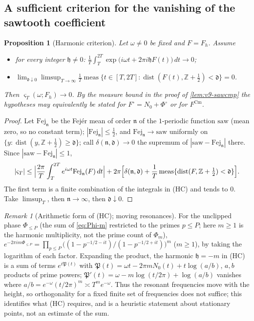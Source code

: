 \documentclass[11pt,a4paper]{article}
\numberwithin{equation}{section}
\newtheorem{proposition}[theorem]{Proposition}
\theoremstyle{definition}
\theoremstyle{remark}
\newtheorem{remark}[theorem]{Remark}
\newcommand{\meas}{\operatorname{meas}}
\newcommand{\Cm}{\mathrm{Cm}}
\begin{document}
\subsection{A sufficient criterion for the vanishing of the sawtooth coefficient}\label{sec:v9-harm}
\begin{proposition}[Harmonic criterion]\label{prop:v9-harm}
Let $\omega\ne0$ be fixed and $F=F_h$. Assume
\begin{itemize}[leftmargin=2em]
\item[(HC)] for every integer $\mathfrak h\ne0$: $\displaystyle\frac1T\int_T^{2T}\exp\bigl(i\omega t+2\pi i\mathfrak h F(t)\bigr)\,dt\to0$;
\item[(NC)] $\displaystyle\lim_{\mathfrak d\downarrow0}\limsup_{T\to\infty}\frac1T\meas\bigl\{t\in[T,2T]:\operatorname{dist}(F(t),\mathbb Z+\tfrac12)<\mathfrak d\bigr\}=0$.
\end{itemize}
Then $\varsigma_T(\omega;F_h)\to0$. By the measure bound in the proof of \cref{lem:v9-sawcmp} the hypotheses may equivalently be stated for $F^\circ=N_0+\Phi^\circ$ or for $F^{\Cm}$.
\end{proposition}
\begin{proof}
Let $\mathrm{Fej}_{\mathfrak n}$ be the Fej\'er mean of order $\mathfrak n$ of the $1$-periodic function $\mathrm{saw}$ (mean zero, so no constant term); $|\mathrm{Fej}_{\mathfrak n}|\le\frac12$, and $\mathrm{Fej}_{\mathfrak n}\to\mathrm{saw}$ uniformly on $\{y:\operatorname{dist}(y,\mathbb Z+\frac12)\ge\mathfrak d\}$; call $\delta(\mathfrak n,\mathfrak d)\to0$ the supremum of $|\mathrm{saw}-\mathrm{Fej}_{\mathfrak n}|$ there. Since $|\mathrm{saw}-\mathrm{Fej}_{\mathfrak n}|\le1$,
\begin{equation}
|\varsigma_T|\le\Bigl|\frac{2\pi}T\int_T^{2T}e^{i\omega t}\mathrm{Fej}_{\mathfrak n}(F)\,dt\Bigr|+2\pi\Bigl[\delta(\mathfrak n,\mathfrak d)+\frac1T\meas\{\operatorname{dist}(F,\mathbb Z+\tfrac12)<\mathfrak d\}\Bigr].
\end{equation}
The first term is a finite combination of the integrals in (HC) and tends to $0$. Take $\limsup_T$, then $\mathfrak n\to\infty$, then $\mathfrak d\downarrow0$.
\end{proof}
\begin{remark}[Arithmetic form of (HC); moving resonances]\label{rem:v9-res}
For the unclipped phase $\Phi_{\le P}$ (the sum of \eqref{eq:Phi-m} restricted to the primes $p\le P$; here $m\ge1$ is the harmonic multiplicity, not the prime count of $\Phi_m$), $e^{-2\pi i m\Phi_{\le P}}=\prod_{p\le P}\bigl((1-p^{-1/2-it})/(1-p^{-1/2+it})\bigr)^{m}$ ($m\ge1$), by taking the logarithm of each factor. Expanding the product, the harmonic $\mathfrak h=-m$ in (HC) is a sum of terms $e^{i\mathfrak P(t)}$ with $\mathfrak P(t)=\omega t-2\pi mN_0(t)+t\log(a/b)$, $a,b$ products of prime powers; $\mathfrak P'(t)=\omega-m\log(t/2\pi)+\log(a/b)$ vanishes where $a/b=e^{-\omega}(t/2\pi)^m\asymp T^me^{-\omega}$. Thus the resonant frequencies move with the height, so orthogonality for a fixed finite set of frequencies does not suffice; this identifies what (HC) requires, and is a heuristic statement about stationary points, not an estimate of the sum.
\end{remark}
\end{document}
